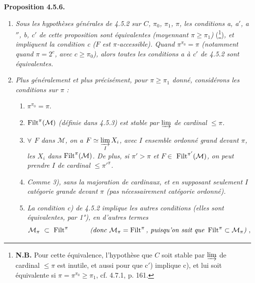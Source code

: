 \textbf{Proposition 4.5.6.}
\begin{enumerate}[leftmargin=3em]
\item[\circled{1\textsuperscript{o}}] \textit{Sous les hypothèses générales de 4.5.2 sur $C$, $\pi_0$, $\pi_1$, $\pi$, les conditions a, a$'$, a$''$, b, c$'$ de cette proposition sont équivalentes (moyennant $\pi \geqslant \pi_1$)} (\footnote{\textbf{N.B.} Pour cette équivalence, l'hypothèse que $C$ soit stable par $\varinjlim$ de cardinal $\leqslant \pi$ est inutile, et aussi pour que c$'$) implique c), et lui soit équivalente si $\pi = \pi^{\pi_0} \geqslant \pi_1$, cf. 4.7.1, p. 161.})\textit{, et impliquent la condition c ($F$ est $\pi$-accessible). Quand $\pi^{\pi_0} = \pi$ (notamment quand $\pi = 2^{c}$, avec $c \geqslant \pi_0$), alors toutes les conditions a à c$'$ de 4.5.2 sont équivalentes.}
\item[\circled{2\textsuperscript{o}}] \textit{Plus généralement et plus précisément, pour $\pi \geqslant \pi_1$ donné, considérons les conditions sur $\pi$ :}
\begin{enumerate}[leftmargin=2em]
\item[\textit{1)}] $\pi^{\pi_0} = \pi$.
\item[\textit{2)}] $\operatorname{Filt}^{\pi}(\mathcal{M})$ \textit{(définie dans 4.5.3) est stable par $\varinjlim$ de cardinal $\leqslant \pi$.}
\item[\textit{3)}] \textit{$\forall$ $F$ dans $\mathcal{M}$, on a $F \simeq \varinjlim\limits_{I} X_i$, avec $I$ ensemble ordonné grand devant $\pi$, les $X_i$ dans} $\operatorname{Filt}^{\pi}(\mathcal{M})$\textit{. De plus, si $\pi' > \pi$ et $F \in$} $\operatorname{Filt}^{\pi'}(\mathcal{M})$\textit{, on peut prendre $I$ de cardinal $\leqslant \pi'^{\pi}$.}
\item[\textit{4)}] \textit{Comme 3), sans la majoration de cardinaux, et en supposant seulement $I$ catégorie grande devant $\pi$ (pas nécessairement catégorie ordonné).} %
\item[\textit{5)}] \textit{La condition c) de 4.5.2 implique les autres conditions (elles sont équivalentes, par 1°), en d'autres termes}
\[
\mathcal{M}_{\pi} \ \subset\ \Filt^{\pi} \qquad\quad \textit{(donc } \mathcal{M}_{\pi} = \Filt^{\pi}\textit{, puisqu'on sait que } \Filt^{\pi} \subset \mathcal{M}_{\pi}\textit{)}\ ,
\]
\end{enumerate}
\end{enumerate}

\setcounter{footnote}{39}

